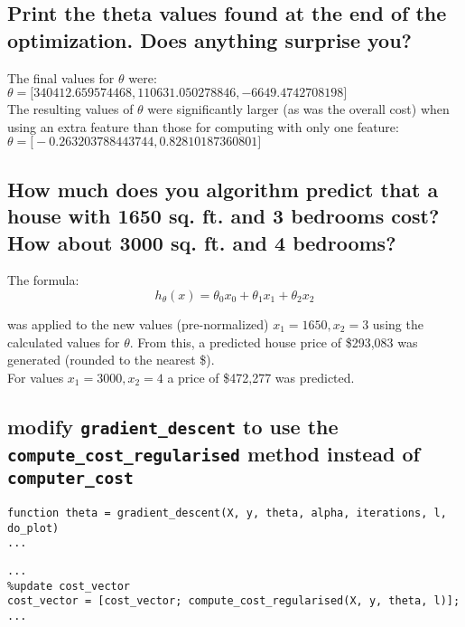\documentclass[titlepage]{scrartcl}
\newcommand{\code}[1]{\texttt{#1}}
\begin{document}
\begin{samepage}
\subsection{Print the theta values found at the end of the optimization. Does anything surprise you?}
The final values for $\theta$ were:\\
$\theta = \big[ 340412.659574468, 110631.050278846, -6649.4742708198 \big]$\\
          
The resulting values of $\theta$ were significantly larger (as was the overall
cost) when using an extra feature than those for computing with only one
feature:\\
$\theta = \big[ -0.263203788443744, 0.82810187360801 \big]$
\end{samepage}

\subsection{How much does you algorithm predict that a house with 1650 sq. ft.
and 3 bedrooms cost? How about 3000 sq. ft. and 4 bedrooms?}

The formula:
$$h_\theta(x)=\theta_0x_0+\theta_1x_1+\theta_2x_2$$

was applied to the new values (pre-normalized) $x_1=1650, x_2=3$ using the calculated
values for $\theta$. From this, a predicted house price of \$293,083 was generated
(rounded to the nearest \$).\\
For values $x_1=3000, x_2=4$ a price of \$472,277 was predicted.

\subsection{modify \code{gradient\_descent} to use the
\code{compute\_cost\_regularised} method instead of \code{computer\_cost}}

\begin{lstlisting}
function theta = gradient_descent(X, y, theta, alpha, iterations, l, do_plot)
...
\end{lstlisting}

\begin{lstlisting}[firstnumber=40]
...
%update cost_vector
cost_vector = [cost_vector; compute_cost_regularised(X, y, theta, l)];
...
\end{lstlisting}\leavevmode \\
\end{document}

